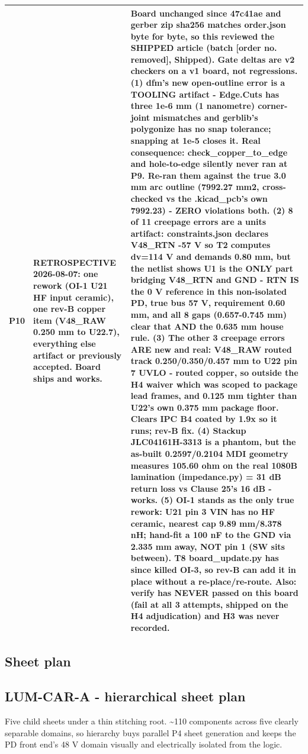 \documentclass[11pt,a4paper]{article}
\begin{document}
{\begin{longtable}{lp{5.2cm}p{7.2cm}}
P10 & RETROSPECTIVE 2026-08-07: one rework (OI-1 U21 HF input ceramic), one rev-B copper item (V48\_RAW 0.250 mm to U22.7), everything else artifact or previously accepted. Board ships and works. & Board unchanged since 47c41ae and gerber zip sha256 matches order.json byte for byte, so this reviewed the SHIPPED article (batch [order no. removed], Shipped). Gate deltas are v2 checkers on a v1 board, not regressions. (1) dfm's new open-outline error is a TOOLING artifact - Edge.Cuts has three 1e-6 mm (1 nanometre) corner-joint mismatches and gerblib's polygonize has no snap tolerance; snapping at 1e-5 closes it. Real consequence: check\_copper\_to\_edge and hole-to-edge silently never ran at P9. Re-ran them against the true 3.0 mm arc outline (7992.27 mm2, cross-checked vs the .kicad\_pcb's own 7992.23) - ZERO violations both. (2) 8 of 11 creepage errors are a units artifact: constraints.json declares V48\_RTN -57 V so T2 computes dv=114 V and demands 0.80 mm, but the netlist shows U1 is the ONLY part bridging V48\_RTN and GND - RTN IS the 0 V reference in this non-isolated PD, true bus 57 V, requirement 0.60 mm, and all 8 gaps (0.657-0.745 mm) clear that AND the 0.635 mm house rule. (3) The other 3 creepage errors ARE new and real: V48\_RAW routed track 0.250/0.350/0.457 mm to U22 pin 7 UVLO - routed copper, so outside the H4 waiver which was scoped to package lead frames, and 0.125 mm tighter than U22's own 0.375 mm package floor. Clears IPC B4 coated by 1.9x so it runs; rev-B fix. (4) Stackup JLC04161H-3313 is a phantom, but the as-built 0.2597/0.2104 MDI geometry measures 105.60 ohm on the real 1080B lamination (impedance.py) = 31 dB return loss vs Clause 25's 16 dB - works. (5) OI-1 stands as the only true rework: U21 pin 3 VIN has no HF ceramic, nearest cap 9.89 mm/8.378 nH; hand-fit a 100 nF to the GND via 2.335 mm away, NOT pin 1 (SW sits between). T8 board\_update.py has since killed OI-3, so rev-B can add it in place without a re-place/re-route. Also: verify has NEVER passed on this board (fail at all 3 attempts, shipped on the H4 adjudication) and H3 was never recorded. \\
\bottomrule
\end{longtable}
}
\subsection*{Sheet plan}
\subsection*{LUM-CAR-A - hierarchical sheet plan}
Five child sheets under a thin stitching root. \textasciitilde{}110 components across five clearly separable domains, so hierarchy buys parallel P4 sheet generation and keeps the PD front end's 48 V domain visually and electrically isolated from the logic.
\end{document}
